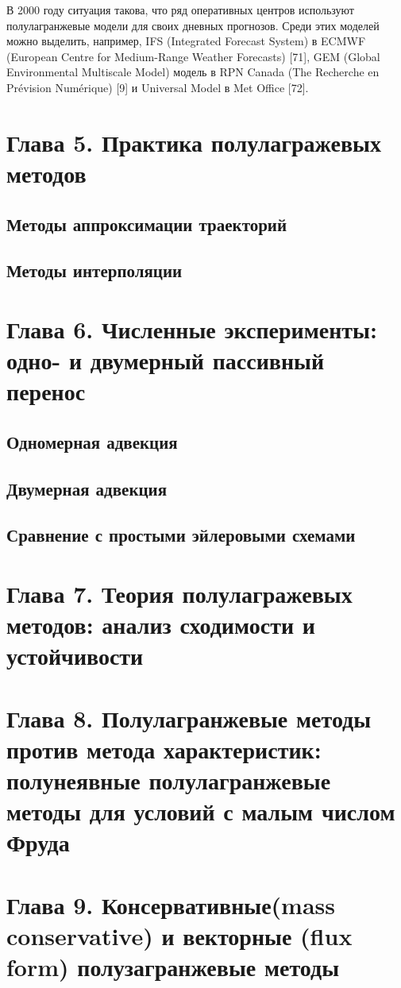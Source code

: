 В 2000 году ситуация такова, что ряд оперативных центров используют полулагранжевые модели для своих дневных прогнозов. Среди этих моделей можно выделить, например, IFS (Integrated Forecast System) в ECMWF (European Centre for Medium-Range Weather Forecasts) [71], GEM (Global Environmental Multiscale Model) модель в RPN Canada (The Recherche en Prévision Numérique) [9] и Universal Model в Met Office [72].
\chapter*{Глава 5. Практика полулагражевых методов} \label{chapt_5}
\section*{Методы аппроксимации траекторий} \label{sect5_1}
\section*{Методы интерполяции} \label{sect5_2}
\chapter*{Глава 6. Численные эксперименты: одно- и двумерный пассивный перенос} \label{chapt_6}
\section*{Одномерная адвекция} \label{sect6_1}
\section*{Двумерная адвекция} \label{sect6_2}
\section*{Сравнение с простыми эйлеровыми схемами} \label{sect6_3}
\chapter*{Глава 7. Теория полулагражевых методов: анализ сходимости и устойчивости} \label{chapt_7}
\chapter*{Глава 8. Полулагранжевые методы против метода характеристик: полунеявные полулагранжевые методы
	 для условий с малым числом Фруда} \label{chapt_8}
\chapter*{Глава 9. Консервативные(mass conservative) и векторные (flux form) полузагранжевые методы} \label{chapt_9}
\newpage
